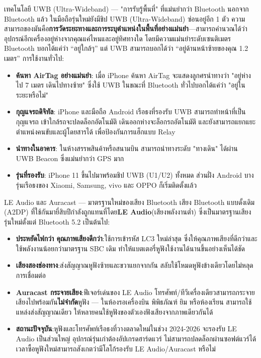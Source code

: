 \begin{tcbinfo}{เทคโนโลยี UWB (Ultra-Wideband) — "การรับรู้พื้นที่" ที่แม่นยำกว่า Bluetooth}
นอกจาก Bluetooth แล้ว ในมือถือรุ่นใหม่ยังมีชิป UWB (Ultra-Wideband) ซ่อนอยู่อีก 1 ตัว ความสามารถของมันคือ\textbf{การวัดระยะทางและการระบุตำแหน่งในพื้นที่อย่างแม่นยำ}—สามารถคำนวณได้ว่าอุปกรณ์อีกเครื่องอยู่ห่างจากคุณแค่ไหนและอยู่ทิศทางใด โดยมีความแม่นยำระดับเซนติเมตร Bluetooth บอกได้แค่ว่า “อยู่ใกล้ๆ” แต่ UWB สามารถบอกได้ว่า “อยู่ด้านหน้าซ้ายของคุณ 1.2 เมตร” การใช้งานทั่วไป:

\begin{itemize}
  \item \textbf{ค้นหา AirTag อย่างแม่นยำ}: เมื่อ iPhone ค้นหา AirTag จะแสดงลูกศรนำทางว่า "อยู่ห่างไป 7 เมตร เดินไปทางซ้าย" ซึ่งใช้ UWB ในขณะที่ Bluetooth ทั่วไปบอกได้แค่ว่า "อยู่ในระยะหรือไม่"
  \item \textbf{กุญแจรถดิจิทัล}: iPhone และมือถือ Android เรือธงที่รองรับ UWB สามารถทำหน้าที่เป็นกุญแจรถ เข้าใกล้รถจะปลดล็อกอัตโนมัติ เดินออกห่างจะล็อกรถอัตโนมัติ และยังสามารถแยกแยะตำแหน่งคนขับและผู้โดยสารได้ เพื่อป้องกันการแฮ็กแบบ Relay
  \item \textbf{นำทางในอาคาร}: ในห้างสรรพสินค้าหรือสนามบิน สามารถนำทางระดับ "ทางเดิน" ได้ผ่าน UWB Beacon ซึ่งแม่นยำกว่า GPS มาก
  \item \textbf{รุ่นที่รองรับ}: iPhone 11 ขึ้นไปมาพร้อมชิป UWB (U1/U2) ทั้งหมด ส่วนฝั่ง Android บางรุ่นเรือธงของ Xiaomi, Samsung, vivo และ OPPO ก็เริ่มติดตั้งแล้ว
\end{itemize}

\end{tcbinfo}

\begin{tcbinfo}{LE Audio และ Auracast — มาตรฐานใหม่ของเสียง Bluetooth}
เสียง Bluetooth แบบดั้งเดิม (A2DP) ที่ใช้กันมายี่สิบปีกำลังถูกแทนที่โดย\textbf{LE Audio}(เสียงพลังงานต่ำ) ซึ่งเป็นมาตรฐานเสียงรุ่นใหม่ตั้งแต่ Bluetooth 5.2 เป็นต้นไป:

\begin{itemize}
  \item \textbf{ประหยัดไฟกว่า คุณภาพเสียงดีกว่า}:ใช้การเข้ารหัส LC3 ใหม่ล่าสุด ซึ่งให้คุณภาพเสียงที่ดีกว่าและใช้พลังงานน้อยกว่ามาตรฐาน SBC เดิม ทำให้แบตเตอรี่หูฟังใช้งานได้นานขึ้นอย่างเห็นได้ชัด
  \item \textbf{เสียงสองช่องทาง}:ส่งสัญญาณหูฟังซ้ายและขวาแยกจากกัน สลับใช้โหมดหูฟังข้างเดียวโดยไม่หลุดการเชื่อมต่อ
  \item \textbf{Auracast กระจายเสียง}:ฟีเจอร์เด่นของ LE Audio โทรศัพท์/ทีวีเครื่องเดียวสามารถกระจายเสียงไปพร้อมกัน\textbf{ไม่จำกัด}หูฟัง — ในห้องรอเครื่องบิน พิพิธภัณฑ์ ยิม หรือห้องเรียน สามารถใช้แหล่งส่งสัญญาณเดียว ให้หลายคนใช้หูฟังของตัวเองฟังเสียงจากภาพเดียวกันได้
  \item \textbf{สถานะปัจจุบัน}:หูฟังและโทรศัพท์เรือธงที่วางตลาดใหม่ในช่วง 2024-2026 จะรองรับ LE Audio เป็นส่วนใหญ่ อุปกรณ์รุ่นเก่าต้องอัปเกรดฮาร์ดแวร์ ไม่สามารถปลดล็อกผ่านซอฟต์แวร์ได้ เวลาซื้อหูฟังใหม่สามารถสังเกตว่ามีโลโก้รองรับ LE Audio/Auracast หรือไม่
\end{itemize}

\end{tcbinfo}


